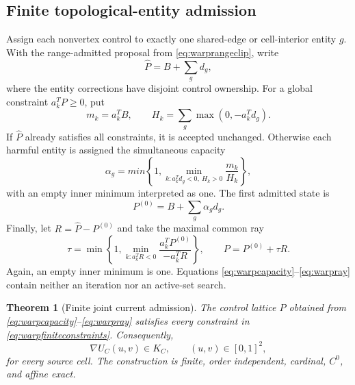 \documentclass[journal]{IEEEtran}
\newtheorem{theorem}{Theorem}
\begin{document}
\subsection{Finite topological-entity admission}

Assign each nonvertex control to exactly one shared-edge or cell-interior
entity \(g\).  With the range-admitted proposal from
\eqref{eq:warprangeclip}, write
\begin{equation}
 \widehat P=B+\sum_gd_g,
 \label{eq:warpgroups}
\end{equation}
where the entity corrections have disjoint control ownership.  For a global
constraint \(a_k^TP\geq0\), put
\begin{equation}
 m_k=a_k^TB,\qquad
 H_k=\sum_g\max(0,-a_k^Td_g).
 \label{eq:warpmargin}
\end{equation}
If \(\widehat P\) already satisfies all constraints, it is accepted
unchanged.  Otherwise each harmful entity is assigned the simultaneous
capacity
\begin{equation}
 \alpha_g=min\!\left\{1,
  \min_{k:a_k^Td_g<0,\ H_k>0}\frac{m_k}{H_k}\right\},
 \label{eq:warpcapacity}
\end{equation}
with an empty inner minimum interpreted as one.  The first admitted state is
\begin{equation}
 P^{(0)}=B+\sum_g\alpha_gd_g.
 \label{eq:warpfirststate}
\end{equation}
Finally, let \(R=\widehat P-P^{(0)}\) and take the maximal common ray
\begin{equation}
 \tau=\min\!\left\{1,
   \min_{k:a_k^TR<0}
   \frac{a_k^TP^{(0)}}{-a_k^TR}\right\},
 \qquad P=P^{(0)}+\tau R.
 \label{eq:warpray}
\end{equation}
Again, an empty inner minimum is one.  Equations
\eqref{eq:warpcapacity}--\eqref{eq:warpray} contain neither an iteration nor
an active-set search.

\begin{theorem}[Finite joint current admission]
The control lattice \(P\) obtained from
\eqref{eq:warpcapacity}--\eqref{eq:warpray} satisfies every constraint in
\eqref{eq:warpfiniteconstraints}.  Consequently,
\begin{equation}
 \nabla U_C(u,v)\in K_C,
 \qquad (u,v)\in[0,1]^2,
 \label{eq:warpgradientcone}
\end{equation}
for every source cell.  The construction is finite, order independent,
cardinal, \(C^0\), and affine exact.
\end{theorem}
\end{document}
